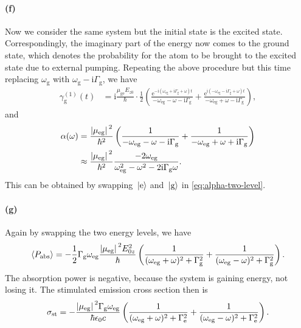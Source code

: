 \documentclass[hyperref, a4paper]{article}
\newcommand*{\ii}{\mathrm{i}}
\newcommand*{\ee}{\mathrm{e}}
\newcommand*{\Gammae}{\Gamma_{\text{e}}}
\newcommand*{\Gammag}{\Gamma_{\text{g}}}
\newcommand*{\omegag}{\omega_{\text{g}}}
\newcommand*{\omegaeg}{\omega_{\text{eg}}}
\newcommand*{\mueg}{\mu_{\text{eg}}}
\newcommand*{\muge}{\mu_{\text{ge}}}
\newcommand*{\Ezzero}{E_{z0}}
\begin{document}
\paragraph{(f)} Now we consider the same system but the initial state is the excited state.
Correspondingly, the imaginary part of the energy now comes to the ground state, 
which denotes the probability for the atom to be brought to the excited state due to external pumping.
Repeating the above procedure but this time 
replacing $\omegag$ with $\omegag - \ii \Gammag$,
we have 
\begin{equation}
    \begin{aligned}
        \gamma_{\text{g}}^{(1)}(t) &= 
        \ii \frac{\muge \Ezzero}{\hbar} \cdot \frac{1}{2} \left(
            \frac{
                \ee^{- \ii (\omegaeg + \ii \Gammag + \omega) t}
            }{
                - \omegaeg - \omega - \ii \Gammag
            } + 
            \frac{
                \ee^{\ii (- \omegaeg - \ii \Gammag + \omega) t}
            }{
                - \omegaeg + \omega - \ii \Gammag
            }   
        \right),
    \end{aligned}
\end{equation}
and 
\begin{equation}
    \begin{aligned}
        \alpha(\omega) &= \frac{\abs*{\mueg}^2}{\hbar^2} \left(
            \frac{1}{- \omegaeg - \omega - \ii \Gammag}
            + \frac{1}{- \omegaeg + \omega + \ii \Gammag}
        \right) \\
        &\approx \frac{\abs*{\mueg}^2}{\hbar^2} \frac{- 2 \omegaeg}{
            \omegaeg^2 - \omega^2 - 2 \ii \Gammag \omega
        } .
    \end{aligned}
\end{equation}
This can be obtained by swapping $\ket*{\text{e}}$ and $\ket*{\text{g}}$ in \eqref{eq:alpha-two-level}.

\paragraph{(g)} Again by swapping the two energy levels, we have 
\begin{equation}
    \expval{P_{\text{abs}}} = 
    - \frac{1}{2} \Gammag \omegaeg \frac{\abs*{\mueg}^2 E_{0z}^2}{\hbar}
    \left(
        \frac{1}{(\omegaeg + \omega)^2 + \Gammag^2} + 
        \frac{1}{(\omegaeg - \omega)^2 + \Gammag^2}
    \right).
\end{equation}
The absorption power is negative, 
because the system is gaining energy, not losing it.
The stimulated emission cross section then is 
\begin{equation}
    \sigma_{\text{st}} = - \frac{\abs*{\mueg}^2 \Gammag \omegaeg}{\hbar \epsilon_0 c}
    \left(
        \frac{1}{(\omegaeg + \omega)^2 + \Gammae^2} + 
        \frac{1}{(\omegaeg - \omega)^2 + \Gammae^2}
    \right).
\end{equation}
\end{document}
